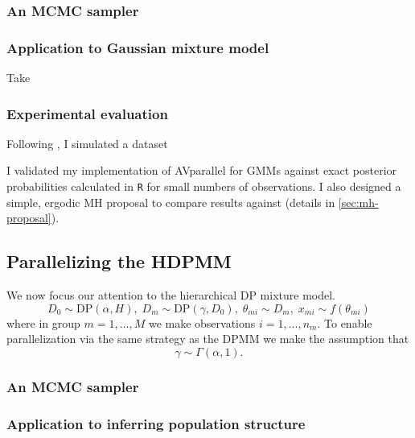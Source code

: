 \documentclass{uwstat572}
\begin{document}
\subsubsection{An MCMC sampler}

\subsubsection{Application to Gaussian mixture model}

Take

\subsubsection{Experimental evaluation}

Following \citet{WDX13}, I simulated a dataset

\citet{GG14}

I validated my implementation of AVparallel for GMMs against exact posterior probabilities calculated in \texttt{R} for small numbers of observations.
I also designed a simple, ergodic MH proposal to compare results against (details in \ref{sec:mh-proposal}).

\subsection{Parallelizing the HDPMM}

We now focus our attention to the hierarchical DP mixture model.
\begin{equation}
  D_0 \sim \text{DP}\left(\alpha, H\right),\;
  D_m \sim \text{DP}\left(\gamma, D_0\right), \;
  \theta_{mi} \sim D_m, \;
  x_{mi} \sim f\left(\theta_{mi}\right)
  \label{eq:hdpmm}
\end{equation}
where in group $m = 1,\dots,M$ we make observations $i = 1,\ldots,n_m$.
To enable parallelization via the same strategy as the DPMM we make the assumption that
\begin{equation}
  \gamma \sim \Gamma\left(\alpha, 1\right).
\end{equation}

\subsubsection{An MCMC sampler}

\subsubsection{Application to inferring population structure}
\end{document}
